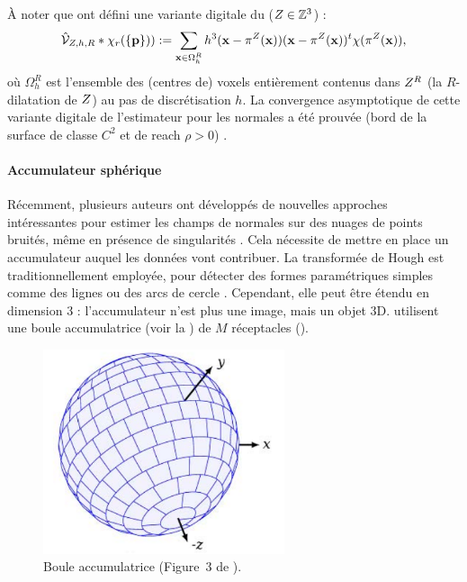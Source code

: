 À noter que  ont défini une variante digitale du
\VCM ($Z \in \mathbb{Z}^3$) :
%
\begin{equation}
  \hat{\mathcal{V}}_{Z,h,R} \ast \chi_r(\{\mathbf{p}\})) := \sum_{\mathbf{x} \in \Omega_h^R} h^3 (\mathbf{x} - \pi^{Z}(\mathbf{x})) (\mathbf{x} - \pi^{Z}(\mathbf{x}))^t \chi(\pi^{Z}(\mathbf{x})) ,
\end{equation}
%
où $\Omega_h^R$ est l'ensemble des (centres de) voxels entièrement contenus dans
$Z^R$ (la $R$-dilatation de $Z$) au pas de discrétisation $h$.
La convergence asymptotique de cette variante digitale de l'estimateur \VCM pour
les normales a été prouvée (bord de la surface de classe $C^2$ et de reach $\rho >
0$) \cite{Cuel2014DGCI}.
%
\paragraph{Accumulateur sphérique}
%
Récemment, plusieurs auteurs ont développés de nouvelles approches intéressantes
pour estimer les champs de normales sur des nuages de points bruités, même en
présence de singularités \cite{Li2010, Boulch2012, Zhang2013}. Cela nécessite de
mettre en place un accumulateur auquel les données vont contribuer. La
transformée de Hough \cite{Hough1962} est traditionnellement employée, pour
détecter des formes paramétriques simples comme des lignes ou des arcs de cercle
\cite{Duda1972}. Cependant, elle peut être étendu en dimension 3 :
l'accumulateur n'est plus une image, mais un objet 3D.
 utilisent une boule accumulatrice (voir la
) de $M$ réceptacles ().

\begin{figure}[ht]{
    \begin{center}
    \includegraphics[height=6cm]{images/Curvature/Hough_ball}
    \end{center}}
    \caption[Boule accumulatrice.]{Boule accumulatrice (Figure~3 de \cite{Borrmann2011}). \label{fig:hough-ball}}
\end{figure}

